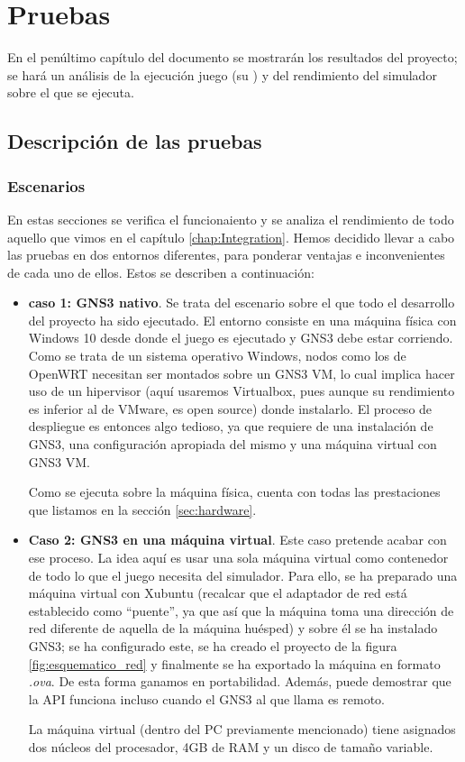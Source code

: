 \chapter{Pruebas}\label{chap:Pruebas}
En el penúltimo capítulo del documento se mostrarán los resultados del proyecto; se hará un análisis de la ejecución juego (su ) y del rendimiento del simulador sobre el que se ejecuta.

\section{Descripción de las pruebas}
\subsection{Escenarios}
En estas secciones se verifica el funcionaiento y se analiza el rendimiento de todo aquello que vimos en el capítulo \ref{chap:Integration}. Hemos decidido llevar a cabo las pruebas en dos entornos diferentes, para ponderar ventajas e inconvenientes de cada uno de ellos. Estos se describen a continuación:
\begin{itemize}
\item \textbf{caso 1: GNS3 nativo}. Se trata del escenario sobre el que todo el desarrollo del proyecto ha sido ejecutado. El entorno consiste en una máquina física con Windows 10 desde donde el juego es ejecutado y GNS3 debe estar corriendo. Como se trata de un sistema operativo Windows, nodos como los de OpenWRT necesitan ser montados sobre un GNS3 VM, lo cual implica hacer uso de un hipervisor (aquí usaremos Virtualbox, pues aunque su rendimiento es inferior al de VMware, es open source) donde instalarlo. El proceso de despliegue es entonces algo tedioso, ya que requiere de una instalación de GNS3, una configuración apropiada del mismo y una máquina virtual con GNS3 VM.

Como se ejecuta sobre la máquina física, cuenta con todas las prestaciones que listamos en la sección \ref{sec:hardware}.
\item \textbf{Caso 2: GNS3 en una máquina virtual}. Este caso pretende acabar con ese proceso. La idea aquí es usar una sola máquina virtual como contenedor de todo lo que el juego necesita del simulador. Para ello, se ha preparado una máquina virtual con Xubuntu (recalcar que el adaptador de red está establecido como ``puente'', ya que así que la máquina toma una dirección de red diferente de aquella de la máquina huésped) y sobre él se ha instalado GNS3; se ha configurado este, se ha creado el proyecto de la figura \ref{fig:esquematico_red} y finalmente se ha exportado la máquina en formato \textit{.ova}. De esta forma ganamos en portabilidad. Además, puede demostrar que la API funciona incluso cuando el GNS3 al que llama es remoto.

La máquina virtual (dentro del PC previamente mencionado) tiene asignados dos núcleos del procesador, 4GB de RAM y un disco de tamaño variable.
\end{itemize}

